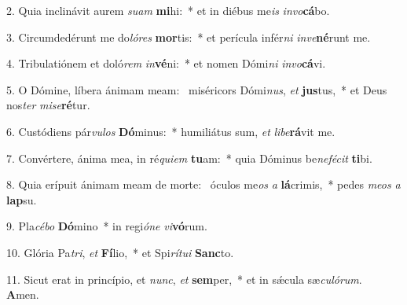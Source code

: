 2. Quia inclinávit aurem \textit{su}\textit{am} \textbf{mi}hi:~*  et in diébus me\textit{is} \textit{in}\textit{vo}\textbf{cá}bo.\

3. Circumdedérunt me do\textit{ló}\textit{res} \textbf{mor}tis:~*  et perícula infér\textit{ni} \textit{in}\textit{ve}\textbf{né}runt me.\

4. Tribulatiónem et doló\textit{rem} \textit{in}\textbf{vé}ni:~*  et nomen Dómi\textit{ni} \textit{in}\textit{vo}\textbf{cá}vi.\

5. O Dómine, líbera ánimam meam: \dag\  miséricors Dómi\textit{nus}, \textit{et} \textbf{jus}tus,~*  et Deus nos\textit{ter} \textit{mi}\textit{se}\textbf{ré}tur.\

6. Custódiens pár\textit{vu}\textit{los} \textbf{Dó}minus:~*  humiliátus sum, \textit{et} \textit{li}\textit{be}\textbf{rá}vit me.\

7. Convértere, ánima mea, in ré\textit{qui}\textit{em} \textbf{tu}am:~*  quia Dóminus be\textit{ne}\textit{fé}\textit{cit} \textbf{ti}bi.\

8. Quia erípuit ánimam meam de morte: \dag\  óculos me\textit{os} \textit{a} \textbf{lá}crimis,~*  pedes \textit{me}\textit{os} \textit{a} \textbf{lap}su.\

9. Pla\textit{cé}\textit{bo} \textbf{Dó}mino~*  in regi\textit{ó}\textit{ne} \textit{vi}\textbf{vó}rum.\

10. Glória Pa\textit{tri}, \textit{et} \textbf{Fí}lio,~*  et Spi\textit{rí}\textit{tu}\textit{i} \textbf{Sanc}to.\

11. Sicut erat in princípio, et \textit{nunc}, \textit{et} \textbf{sem}per,~*  et in sǽcula sæ\textit{cu}\textit{ló}\textit{rum}. \textbf{A}men.\

